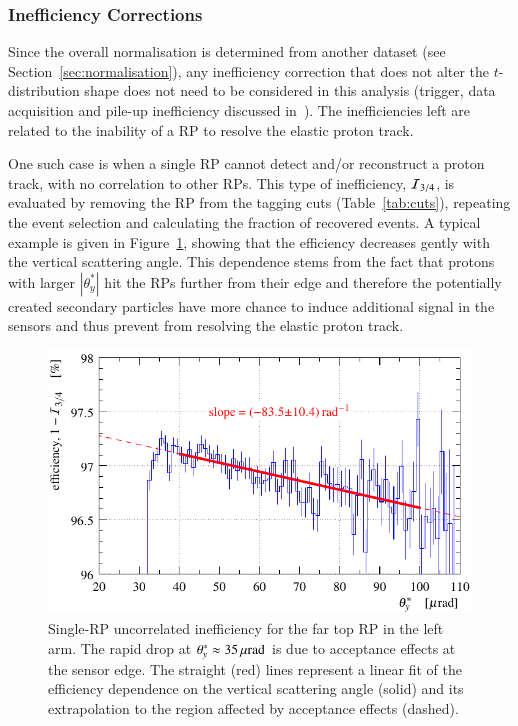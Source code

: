 \subsubsection{Inefficiency Corrections}
\label{sec:ineff corr}

Since the overall normalisation is determined from another dataset (see Section~\ref{sec:normalisation}), any inefficiency correction that does not alter the $t$-distribution shape does not need to be considered in this analysis (trigger, data acquisition and pile-up inefficiency discussed in~\cite{epl101-el,prl111}). The inefficiencies left are related to the inability of a RP to resolve the elastic proton track.

One such case is when a single RP cannot detect and/or reconstruct a proton track, with no correlation to other RPs. This type of inefficiency, ${\cal I}_{3/4}$, is evaluated by removing the RP from the tagging cuts (Table~\ref{tab:cuts}), repeating the event selection and calculating the fraction of recovered events. A typical example is given in Figure~\ref{fig:eff 3/4}, showing that the efficiency decreases gently with the vertical scattering angle. This dependence stems from the fact that protons with larger $|\theta_y^*|$ hit the RPs further from their edge and therefore the potentially created secondary particles have more chance to induce additional signal in the sensors and thus prevent from resolving the elastic proton track.

\begin{figure}
\begin{center}
\includegraphics{fig/eff3outof4_details_fits.pdf}
\vskip-3mm
\caption{%
Single-RP uncorrelated inefficiency for the far top RP in the left arm. The rapid drop at $\theta_y^* \approx 35\,{\rm \mu rad}$ is due to acceptance effects at the sensor edge. The straight (red) lines represent a linear fit of the efficiency dependence on the vertical scattering angle (solid) and its extrapolation to the region affected by acceptance effects (dashed).
}
\label{fig:eff 3/4}
\end{center}
\end{figure}

